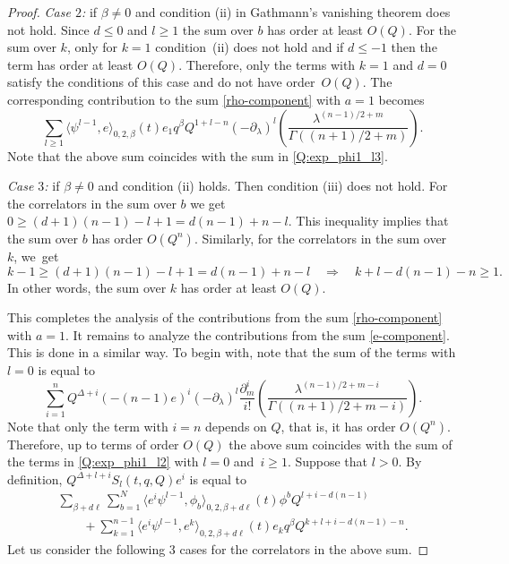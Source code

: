 \documentclass[pdftex]{sigma}
\numberwithin{equation}{section}
\begin{document}
\begin{proof}
{\em Case $2$:} if $\beta\neq 0$ and condition (ii) in Gathmann's vanishing theorem does not hold. Since ${d\leq 0}$ and $l\geq 1$ the sum over $b$ has order at least $O(Q)$. For the sum over $k$, only for $k=1$ condition~(ii) does not hold and if $d\leq -1$ then the term has order at least $O(Q)$. Therefore, only the terms with $k=1$ and $d=0$ satisfy the conditions of this case and do not have order~$O(Q)$. The corresponding contribution to the sum \eqref{rho-component} with $a=1$ becomes
\[
\sum_{l\geq 1}
\big\langle \psi^{l-1}, e\big\rangle_{0,2,\beta} (t) e_1 q^\beta Q^{1+l-n}
(-\partial_\lambda)^l
\left(
\frac{\lambda^{(n-1)/2+m}}{
\Gamma((n+1)/2+m)}
\right).
\]
Note that the above sum coincides with the sum in \eqref{Q:exp_phi1_l3}.

{\em Case $3$:} if $\beta\neq 0$ and condition (ii) holds. Then condition (iii) does not hold. For the correlators in the sum over $b$ we get $0\geq (d+1)(n-1) -l+1 =d(n-1) +n-l$. This inequality implies that the sum over $b$ has order $O(Q^n)$. Similarly, for the correlators in the sum over~$k$, we~get
\[
k-1\geq (d+1)(n-1)-l+1 = d(n-1)+n-l\quad
\Rightarrow \quad
k+l-d(n-1) -n \geq 1.
\]
In other words, the sum over $k$ has order at least $O(Q)$.

This completes the analysis of the contributions from the sum \eqref{rho-component} with $a=1$. It remains to analyze the contributions from the sum \eqref{e-component}. This is done in a similar way. To begin with, note that the sum of the terms with $l=0$ is equal to
\[
\sum_{i=1}^n Q^{\Delta+i}(-(n-1)e)^i
(-\partial_\lambda)^l
\frac{\partial_m^i}{i!}
\left(
\frac{\lambda^{(n-1)/2+m-i}}{
\Gamma((n+1)/2+m-i)}
\right).
\]
Note that only the term with $i=n$ depends on $Q$, that is, it has order $O(Q^n)$. Therefore, up to terms of order $O(Q)$ the above sum coincides with the sum of the terms in \eqref{Q:exp_phi1_l2} with $l=0$ and~$i\geq 1$. Suppose that $l>0$. By definition, $Q^{\Delta+l+i}S_l(t,q,Q)e^i$ is equal to
\begin{gather*}%
\sum_{\beta+d\ell }
\sum_{b=1}^N
\big\langle e^i\psi^{l-1},\phi_b\big\rangle_{0,2,\beta+d\ell} (t) \phi^b Q^{l+i-d(n-1)} \\
\qquad{} +
\sum_{k=1}^{n-1}
\big\langle e^i \psi^{l-1}, e^k\big\rangle_{0,2,\beta+d\ell} (t) e_k q^\beta Q^{k+l+i-d(n-1)-n}.
\end{gather*}
Let us consider the following 3 cases for the correlators in the above sum.


\end{proof}
\end{document}
